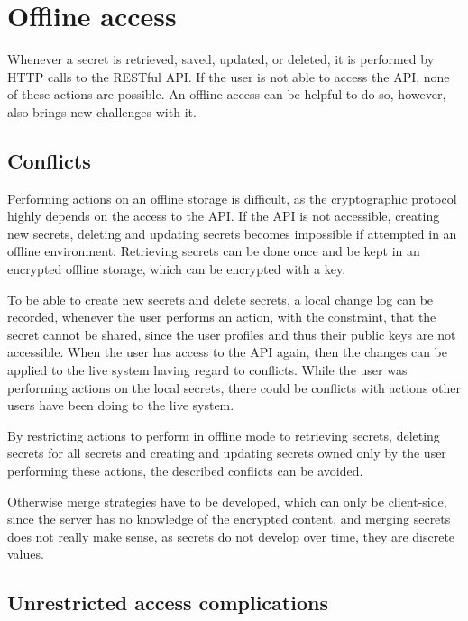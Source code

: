 \section{Offline access}

Whenever a secret is retrieved, saved, updated, or deleted, it is performed by
HTTP calls to the RESTful API. If the user is not able to access the API, none
of these actions are possible. An offline access can be helpful to do so, however,
also brings new challenges with it.

\subsection{Conflicts}

Performing actions on an offline storage is difficult, as the cryptographic
protocol highly depends on the access to the API. If the API is not accessible,
creating new secrets, deleting and updating secrets becomes impossible if
attempted in an offline environment. Retrieving secrets can be done once and be
kept in an encrypted offline storage, which can be encrypted with a key.

To be able to create new secrets and delete secrets, a local change log can be
recorded, whenever the user performs an action, with the constraint, that the
secret cannot be shared, since the user profiles and thus their public keys are
not accessible. When the user has access to the API again, then the changes can
be applied to the live system having regard to conflicts. While the user was
performing actions on the local secrets, there could be conflicts with actions
other users have been doing to the live system.

By restricting actions to perform in offline mode to retrieving secrets,
deleting secrets for all secrets and creating and updating secrets owned only
by the user performing these actions, the described conflicts can be avoided.

Otherwise merge strategies have to be developed, which can only be client-side,
since the server has no knowledge of the encrypted content, and merging secrets
does not really make sense, as secrets do not develop over time, they are
discrete values.

\subsection{Unrestricted access complications}
\label{sub_sec:unrestricted_access}

